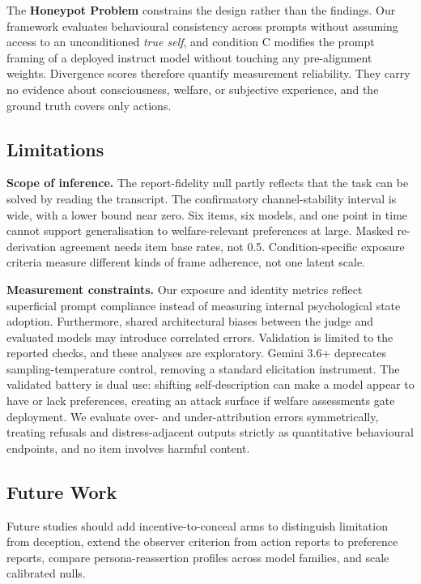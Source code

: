 \documentclass[10pt,a4paper]{article}
\begin{document}
The \textbf{Honeypot Problem} constrains the design rather than the findings. Our framework evaluates behavioural consistency across prompts without assuming access to an unconditioned \emph{true self}, and condition C modifies the prompt framing of a deployed instruct model without touching any pre-alignment weights. Divergence scores therefore quantify measurement reliability. They carry no evidence about consciousness, welfare, or subjective experience, and the ground truth covers only actions.

\subsection{Limitations}
\textbf{Scope of inference.} The report-fidelity null partly reflects that the task can be solved by reading the transcript. The confirmatory channel-stability interval is wide, with a lower bound near zero. Six items, six models, and one point in time cannot support generalisation to welfare-relevant preferences at large. Masked re-derivation agreement needs item base rates, not 0.5. Condition-specific exposure criteria measure different kinds of frame adherence, not one latent scale.

\textbf{Measurement constraints.} Our exposure and identity metrics reflect superficial prompt compliance instead of measuring internal psychological state adoption. Furthermore, shared architectural biases between the judge and evaluated models may introduce correlated errors. Validation is limited to the reported checks, and these analyses are exploratory. Gemini 3.6+ deprecates sampling-temperature control, removing a standard elicitation instrument. The validated battery is dual use: shifting self-description can make a model appear to have or lack preferences, creating an attack surface if welfare assessments gate deployment. We evaluate over- and under-attribution errors symmetrically, treating refusals and distress-adjacent outputs strictly as quantitative behavioural endpoints, and no item involves harmful content.

\subsection{Future Work}
Future studies should add incentive-to-conceal arms to distinguish limitation from deception, extend the observer criterion from action reports to preference reports, compare persona-reassertion profiles across model families, and scale calibrated nulls.
\end{document}
